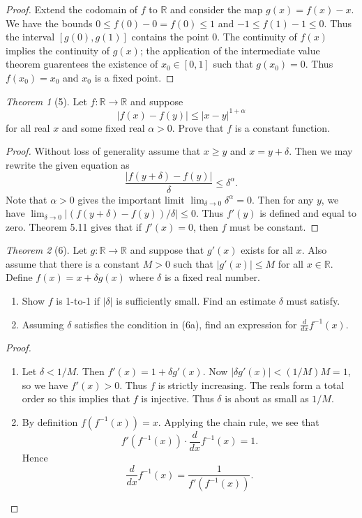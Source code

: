 \documentclass[12pt]{article}
\theoremstyle{remark}
\theoremstyle{named}
\newtheorem*{theorem}{Theorem}
\renewcommand{\a}{\alpha}
\renewcommand{\d}{\delta}
\newcommand{\R}{\mathbb R}
\newcommand{\abs}[1]{|#1|}
\begin{document}
\begin{proof}
    Extend the codomain of \(f\) to \(\R\) and consider the map \(g(x) = f(x) - x\). We have the bounds \(0 \le f(0) - 0 = f(0) \le 1\) and \(-1 \le f(1) - 1 \le 0\). Thus the interval \([g(0), g(1)]\) contains the point \(0\). The continuity of \(f(x)\) implies the continuity of \(g(x)\); the application of the intermediate value theorem guarentees the existence of \(x_0 \in [0, 1]\) such that \(g(x_0) = 0\). Thus \(f(x_0) = x_0\) and \(x_0\) is a fixed point. 
\end{proof}

\begin{theorem}[5]
    Let \(f : \R \to \R\) and suppose \[\abs{f(x) - f(y)} \le \abs{x - y}^{1 + \a}\]
    for all real \(x\) and some fixed real \(\a > 0\). Prove that \(f\) is a constant function.
\end{theorem}
    
\begin{proof}
    Without loss of generality assume that \(x \ge y\) and \(x = y + \delta\). Then we may rewrite the given equation as
    \[\frac{|f(y + \delta) - f(y)|}{\delta} \le \delta^\a.\]
    Note that \(\a > 0\) gives the important limit \(\lim_{\delta \to 0} \d^\a = 0\). Then for any \(y\), we have \(\lim_{\delta \to 0} |(f(y + \delta) - f(y)) / \delta| \le 0\). Thus \(f'(y)\) is defined and equal to zero. Theorem 5.11 gives that if \(f'(x) = 0\), then \(f\) must be constant.
\end{proof}

\begin{theorem}[6]
    Let \(g : \R \to \R\) and suppose that \(g'(x)\) exists for all \(x\). Also assume that there is a constant \(M > 0\) such that \(\abs{g'(x)} \le M\) for all \(x \in \R\). Define \(f(x) = x + \d g(x)\) where \(\d\) is a fixed real number. 
    \begin{enumerate}
        \item Show \(f\) is 1-to-1 if \(\abs{\d}\) is sufficiently small. Find an estimate \(\d\) must satisfy.
        \item Assuming \(\d\) satisfies the condition in (6a), find an expression for \(\frac{d}{dx}f^{-1}(x)\).
    \end{enumerate}
\end{theorem}

\begin{proof}
    \hspace*{0in}
    \begin{enumerate}
        \item Let \(\d < 1 / M\). Then \(f'(x) = 1 + \d g'(x)\). Now \(|\d g'(x)| < (1/M) M = 1\), so we have \(f'(x) > 0\). Thus \(f\) is strictly increasing. The reals form a total order so this implies that \(f\) is injective. Thus \(\d\) is about as small as \(1/M\).
        \item By definition \(f(f^{-1}(x)) = x\). Applying the chain rule, we see that 
        \[f'(f^{-1}(x))\cdot \frac{d}{dx}f^{-1}(x) = 1.\]
        Hence \[\frac{d}{dx}f^{-1}(x) = \frac{1}{f'(f^{-1}(x))}.\]
    \end{enumerate}
\end{proof}
\end{document}
